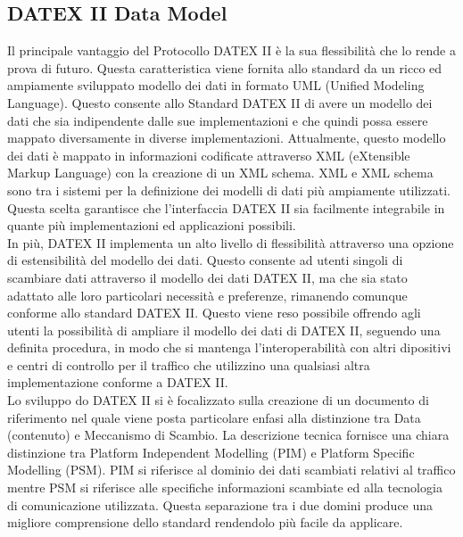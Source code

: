 \subsection{DATEX II Data Model}
\label{sec:datexii_data_model}
Il principale vantaggio del Protocollo DATEX II è la sua flessibilità che lo rende a prova di futuro. Questa caratteristica viene fornita allo standard da un ricco ed ampiamente sviluppato modello dei dati in formato UML (Unified Modeling Language). Questo consente allo Standard DATEX II di avere un modello dei dati che sia indipendente dalle sue implementazioni e che quindi possa essere mappato diversamente in diverse implementazioni.
Attualmente, questo modello dei dati è mappato in informazioni codificate attraverso XML (eXtensible Markup Language) con la creazione di un XML schema. XML e XML schema sono tra i sistemi per la definizione dei modelli di dati più ampiamente utilizzati. Questa scelta garantisce che l'interfaccia DATEX II sia facilmente integrabile in quante più implementazioni ed applicazioni possibili.\\
In più, DATEX II implementa un alto livello di flessibilità attraverso una opzione di estensibilità del modello dei dati. Questo consente ad utenti singoli di scambiare dati attraverso il modello dei dati DATEX II, ma che sia stato adattato alle loro particolari necessità e preferenze, rimanendo comunque conforme allo standard DATEX II. Questo viene reso possibile offrendo agli utenti la possibilità di ampliare il modello dei dati di DATEX II, seguendo una definita procedura, in modo che si mantenga l'interoperabilità con altri dipositivi e centri di controllo per il traffico che utilizzino una qualsiasi altra implementazione conforme a DATEX II. \cite{famous:paper_datexii_research}\\
Lo sviluppo do DATEX II si è focalizzato sulla creazione di un documento di riferimento nel quale viene posta particolare enfasi alla distinzione tra Data (contenuto) e Meccanismo di Scambio. La descrizione tecnica fornisce una chiara distinzione tra Platform Independent Modelling (PIM) e Platform Specific Modelling (PSM). PIM si riferisce al dominio dei dati scambiati relativi al traffico mentre PSM si riferisce alle specifiche informazioni scambiate ed alla tecnologia di comunicazione utilizzata.
Questa separazione tra i due domini produce una migliore comprensione dello standard rendendolo più facile da applicare.

